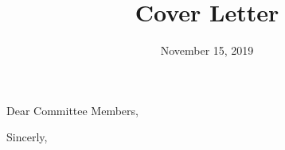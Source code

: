 \documentclass[11pt,a4paper,sans]{moderncv}        %
\begin{document}
\iffalse
\section{References}
\vspace{1em}

\begin{enumerate}
	\itemsep1em 
	\item Linda Spentzouris, IIT
	\begin{itemize}
		\item[] Phone: 312.567.3577
		\item[] Email: linda@agni.phys.iit.edu
	\end{itemize}
	\item Andreas Adelmann, PSI
	\begin{itemize}
		\item[] Phone: 41.56.310.4233
		\item[] Email: andreas.adelmann@psi.ch
	\end{itemize}
	\item Jeffrey Larson, MCS-ANL
	\begin{itemize}
		\item[] Phone: 630.252.3221
		\item[] Email: jmlarson@anl.gov
	\end{itemize}
	\item Chunguang Jing, Euclid Techlabs, LLC
	\begin{itemize}
		\item[] Phone: 630.313.6562
		\item[] Email: jingchunguang@gmail.com
	\end{itemize}
	
\end{enumerate}
\fi

\clearpage

\title{Cover Letter}
\date{November 15, 2019}
\opening{Dear Committee Members,}
\closing{Sincerly,\vspace{4em}}
\makelettertitle




\makeletterclosing
\end{document}
